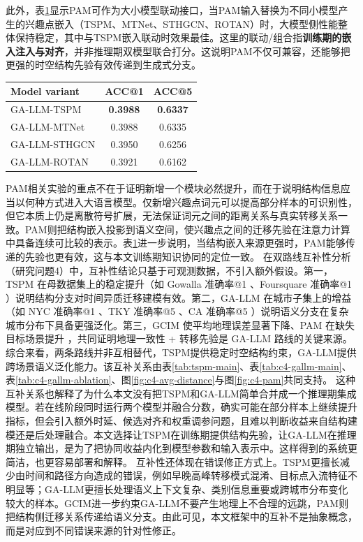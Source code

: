 此外，表\ref{tab:c4-pam-embedding-source}显示PAM可作为大小模型联动接口，当PAM输入替换为不同小模型产生的兴趣点嵌入（TSPM、MTNet、STHGCN、ROTAN）时，大模型侧性能整体保持稳定，其中与TSPM嵌入联动时效果最佳。这里的联动/组合指\textbf{训练期的嵌入注入与对齐}，并非推理期双模型联合打分。这说明PAM不仅可兼容，还能够把更强的时空结构先验有效传递到生成式分支。

\begin{table}[htbp]
    \tblstyle
    \label{tab:c4-pam-embedding-source}
    \begin{tabular}{lcc}
        \toprule
        Model variant & ACC@1 & ACC@5 \\
        \midrule
        GA-LLM-TSPM & \textbf{0.3988} & \textbf{0.6337} \\
        GA-LLM-MTNet & 0.3988 & 0.6335 \\
        GA-LLM-STHGCN & 0.3950 & 0.6256 \\
        GA-LLM-ROTAN & 0.3921 & 0.6162 \\
        \bottomrule
    \end{tabular}
\end{table}

PAM相关实验的重点不在于证明新增一个模块必然提升，而在于说明结构信息应当以何种方式进入大语言模型。仅新增兴趣点词元可以提高部分样本的可识别性，但它本质上仍是离散符号扩展，无法保证词元之间的距离关系与真实转移关系一致。PAM则把结构嵌入投影到语义空间，使兴趣点之间的迁移先验在注意力计算中具备连续可比较的表示。表\ref{tab:c4-pam-embedding-source}进一步说明，当结构嵌入来源更强时，PAM能够传递的先验也更有效，这与本文训练期知识协同的定位一致。
在双路线互补性分析（研究问题4）中，互补性结论只基于可观测数据，不引入额外假设。第一，TSPM 在母数据集上的稳定提升（如 Gowalla 准确率@1 、Foursquare 准确率@1 ）说明结构分支对时间异质迁移建模有效。第二，GA-LLM 在城市子集上的增益（如 NYC 准确率@1 、TKY 准确率@5 、CA 准确率@5 ）说明语义分支在复杂城市分布下具备更强泛化。第三，GCIM 使平均地理误差显著下降、PAM 在缺失目标场景提升 ，共同证明地理一致性 + 转移先验是 GA-LLM 路线的关键来源。
综合来看，两条路线并非互相替代，TSPM提供稳定时空结构约束，GA-LLM提供跨场景语义泛化能力。该互补关系由表\ref{tab:tspm-main}、表\ref{tab:c4-gallm-main}、表\ref{tab:c4-gallm-ablation}、图\ref{fig:c4-avg-distance}与图\ref{fig:c4-pam}共同支持。
这种互补关系也解释了为什么本文没有把TSPM和GA-LLM简单合并成一个推理期集成模型。若在线阶段同时运行两个模型并融合分数，确实可能在部分样本上继续提升指标，但会引入额外时延、候选对齐和权重调参问题，且难以判断收益来自结构建模还是后处理融合。本文选择让TSPM在训练期提供结构先验，让GA-LLM在推理期独立输出，是为了把协同收益内化到模型参数和输入表示中。这样得到的系统更简洁，也更容易部署和解释。
互补性还体现在错误修正方式上。TSPM更擅长减少由时间和路径方向造成的错误，例如早晚高峰转移模式混淆、目标点入流特征不明显等；GA-LLM更擅长处理语义上下文复杂、类别信息重要或跨城市分布变化较大的样本。GCIM进一步约束GA-LLM不要产生地理上不合理的远跳，PAM则把结构侧迁移关系传递给语义分支。由此可见，本文框架中的互补不是抽象概念，而是对应到不同错误来源的针对性修正。


